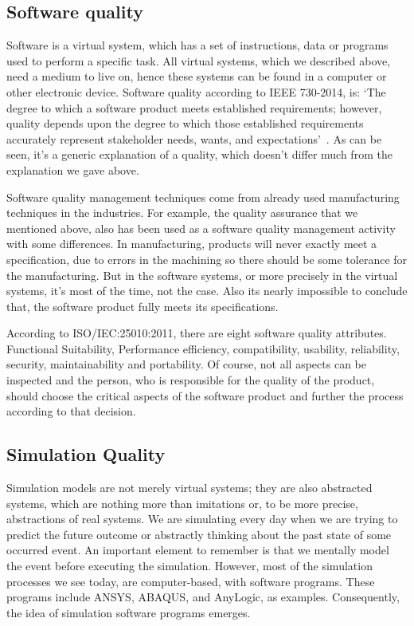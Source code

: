 \documentclass[9pt,conference]{IEEEtran}
\begin{document}
    \subsection*{Software quality}
    Software is a  virtual system, which has a set of instructions, data or programs used to perform a specific task. 
    All virtual systems, which we described above, need a medium to live on, hence these systems can be found in a computer or other electronic device.  
    Software quality according to IEEE 730-2014, is: 
    `The degree to which a software product meets established requirements; however, 
    quality depends upon the degree to which those established requirements accurately represent stakeholder needs, wants, and expectations'~\cite{IEE730-2014}. 
    As can be seen, it's a generic explanation of a quality, which doesn't differ much from the explanation we gave above. 

    Software quality management techniques come from already used manufacturing techniques in the industries.
    For example, the quality assurance that we mentioned above, also has been used as a software quality management activity with some differences. 
    In manufacturing, products will never exactly meet a specification, due to errors in the machining so there should be some tolerance for the manufacturing. 
    But in the software systems, or more precisely in the virtual systems, it's most of the time, not the case. 
    Also its nearly impossible to conclude that, the software product fully meets its specifications\cite{SoftwareEngineering}.

    According to ISO/IEC:25010:2011, there are eight software quality attributes. Functional Suitability, 
    Performance efficiency, compatibility, usability, reliability, security, maintainability and portability.\cite{ISO/IEC:25010}
    Of course, not all aspects can be inspected and the person, who is responsible for the quality of the product, should choose the critical aspects of the software product and further the process according to that decision.

    \subsection*{Simulation Quality}
    Simulation models are not merely virtual systems; they are also abstracted systems, which are nothing more than imitations or, to be more precise, abstractions of real systems. 
    We are simulating every day when we are trying to predict the future outcome or abstractly thinking about the past state of some occurred event. 
    An important element to remember is that we mentally model the event before executing the simulation. However, most of the simulation processes we see today, 
    are computer-based, with software programs. These programs include ANSYS\cite{Ansys}, ABAQUS\cite{Abaqus}, and AnyLogic\cite{AnyLogic}, as examples. Consequently, the idea of simulation software programs emerges.
\end{document}
